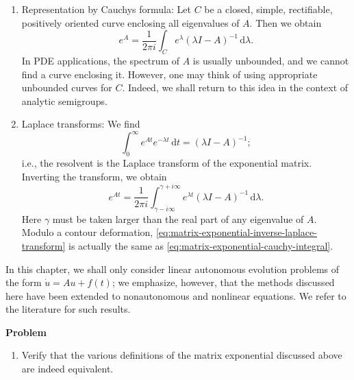 \begin{enumerate}
\item Representation by Cauchy\textquotesingle s formula: Let $C$ be a closed, simple, rectifiable, positively oriented curve enclosing all eigenvalues of $A$. Then we obtain
\begin{equation}\label{eq:matrix-exponential-cauchy-integral}
e^A=\dfrac{1}{2\pi i}\int_C e^\lambda(\lambda I-A)^{-1}\,\mathrm{d}\lambda.
\end{equation}
In PDE applications, the spectrum of $A$ is usually unbounded, and we cannot find a curve enclosing it. However, one may think of using appropriate unbounded curves for $C$. Indeed, we shall return to this idea in the context of analytic semigroups.

\item Laplace transforms: We find
\begin{equation}\label{eq:matrix-exponential-laplace-transform-resolvent}
\int_0^\infty e^{At}e^{-\lambda t}\,\mathrm{d}t=(\lambda I-A)^{-1};
\end{equation}
i.e., the resolvent is the Laplace transform of the exponential matrix. Inverting the transform, we obtain
\begin{equation}\label{eq:matrix-exponential-inverse-laplace-transform}
e^{At}=\dfrac{1}{2\pi i}\int_{\gamma-i\infty}^{\gamma+i\infty}e^{\lambda t}(\lambda I-A)^{-1}\,\mathrm{d}\lambda.
\end{equation}
Here $\gamma$ must be taken larger than the real part of any eigenvalue of $A$. Modulo a contour deformation, \eqref{eq:matrix-exponential-inverse-laplace-transform} is actually the same as \eqref{eq:matrix-exponential-cauchy-integral}.\end{enumerate}

In this chapter, we shall only consider linear autonomous evolution problems of the form $\dot u=Au+f(t)$; we emphasize, however, that the methods discussed here have been extended to nonautonomous and nonlinear equations. We refer to the literature for such results.

\textbf{Problem}

\begin{enumerate}[label=\thesection.\arabic*.,ref=\thesection.\arabic*,start=1,series=book-problems]

\item\label{ex:matrix-exponential-definitions-equivalence} Verify that the various definitions of the matrix exponential discussed above are indeed equivalent.

\end{enumerate}

